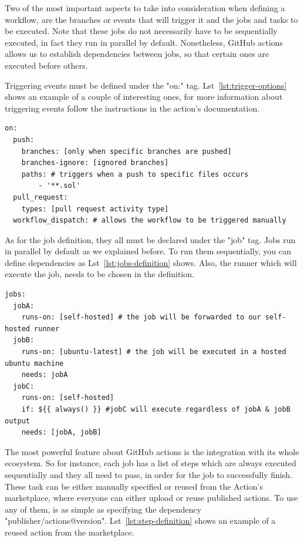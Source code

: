 Two of the most important aspects to take into consideration when defining a workflow, are the branches or events that will trigger it and the jobs and tasks to be executed. Note that these jobs do not necessarily have to be sequentially executed, in fact they run in parallel by default. Nonetheless, GitHub actions allows us to establish dependencies between jobs, so that certain ones are executed before others.

Triggering events must be defined under the "on:" tag. Lst~\ref{lst:trigger-options} shows an example of a couple of interesting ones, for more information about triggering events follow the instructions in the action's documentation.

\begin{lstlisting}[caption=Common Workflow Triggers,label={lst:trigger-options}]
on:
  push:
    branches: [only when specific branches are pushed]
    branches-ignore: [ignored branches]
    paths: # triggers when a push to specific files occurs
        - '**.sol'
  pull_request:
    types: [pull request activity type]
  workflow_dispatch: # allows the workflow to be triggered manually
\end{lstlisting}

As for the job definition, they all must be declared under the "job" tag. Jobs run in parallel by default as we explained before. To run them sequentially, you can define dependencies as Lst~\ref{lst:jobs-definition} shows. Also, the runner which will execute the job, needs to be chosen in the definition.

\begin{lstlisting}[caption=Job Dependencies Definition,label={lst:jobs-definition}]
jobs:
  jobA:
    runs-on: [self-hosted] # the job will be forwarded to our self-hosted runner
  jobB:
    runs-on: [ubuntu-latest] # the job will be executed in a hosted ubuntu machine
    needs: jobA
  jobC:
    runs-on: [self-hosted]
    if: ${{ always() }} #jobC will execute regardless of jobA & jobB output
    needs: [jobA, jobB]
\end{lstlisting}

The most powerful feature about GitHub actions is the integration with its whole ecosystem. So for instance, each job has a list of steps which are always executed sequentially and they all need to pass, in order for the job to successfully finish. These task can be either manually specified or reused from the Action's marketplace, where everyone can either upload or reuse published actions. To use any of them, is as simple as specifying the dependency "publisher/actions@version". Lst~\ref{lst:step-definition} shows an example of a reused action from the marketplace.

